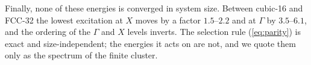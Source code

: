 Finally, none of these energies is converged in system size.  Between cubic-16
and FCC-32 the lowest excitation at $X$ moves by a factor $1.5$--$2.2$ and at
$\Gamma$ by $3.5$--$6.1$, and the ordering of the $\Gamma$ and $X$ levels
inverts.  The selection rule (\ref{eq:parity}) is exact and size-independent;
the energies it acts on are not, and we quote them only as the spectrum of the
finite cluster.
